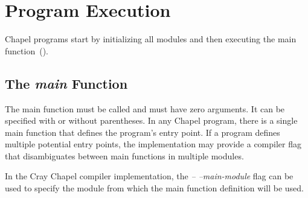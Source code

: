 \section{Program Execution}
\label{Program_Execution}

Chapel programs start by initializing all modules and then executing
the main function~().

\subsection{The {\em main} Function}
\label{The_main_Function}

The main function must be called  and must have zero
arguments.  It can be specified with or without parentheses.  In any
Chapel program, there is a single main function that defines the
program's entry point.  If a program defines multiple potential entry
points, the implementation may provide a compiler flag that
disambiguates between main functions in multiple modules.

\begin{craychapel}
In the Cray Chapel compiler implementation, the \emph{--
--main-module} flag can be used to specify the module from which the
main function definition will be used.
\end{craychapel}

